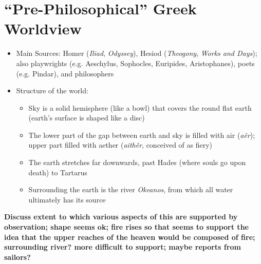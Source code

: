 \documentclass[11pt]{article}
\begin{document}
\section*{``Pre-Philosophical'' Greek Worldview}
\begin{itemize}\item{Main Sources: Homer (\emph{Iliad}, \emph{Odyssey}), Hesiod (\emph{Theogony}, \emph{Works and Days}); also playwrights (e.g. Aeschylus, Sophocles, Euripides, Aristophanes), poets (e.g. Pindar), and philosophers}

\item{Structure of the world:} \begin{itemize}\item{Sky is a solid hemisphere (like a bowl) that covers the round flat earth (earth's surface is shaped like a disc)}\item{The lower part of the gap between earth and sky is filled with air (\emph{a\^{e}r}); upper part filled with aether (\emph{aith\^{e}r}, conceived of as fiery)}\item{The earth stretches far downwards, past Hades (where souls go upon death) to Tartarus}\item{Surrounding the earth is the river \emph{Okeanos}, from which all water ultimately has its source}\end{itemize}\end{itemize}\textbf{Discuss extent to which various aspects of this are supported by observation; shape seems ok; fire rises so that seems to support the idea that the upper reaches of the heaven would be composed of fire; surrounding river? more difficult to support; maybe reports from sailors?}
\end{document}
